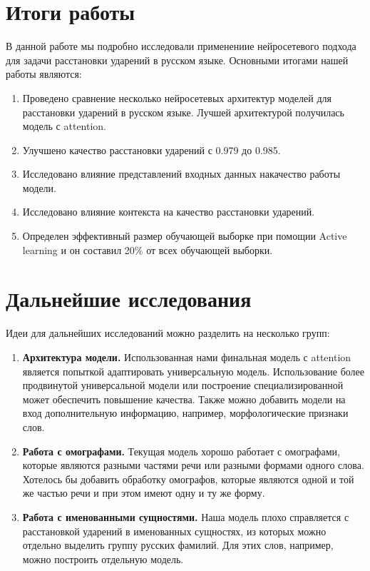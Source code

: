 \documentclass[14pt, a4paper, russian]{extreport}
\begin{document}
\section*{Итоги работы}
В данной работе мы подробно исследовали применениие нейросетевого подхода для задачи расстановки ударений в русском языке.  Основными итогами нашей работы являются:
\begin{enumerate}[  1{)}  ]
	\item Проведено сравнение несколько нейросетевых архитектур моделей для расстановки ударений в русском языке. Лучшей архитектурой получилась модель с attention.
	\item Улучшено качество расстановки ударений с 0.979 до 0.985.
	\item Исследовано влияние представлений входных данных накачество работы модели.
	\item Исследовано влияние контекста на качество расстановки ударений.
	\item Определен эффективный размер обучающей выборке при помощии Active learning и он составил 20\% от всех обучающей выборки. 

\end{enumerate}
\section*{Дальнейшие исследования}
Идеи для дальнейших исследований можно разделить на несколько групп:
\begin{enumerate}[ 1{)} ]
	\item \textbf{Архитектура модели.} Использованная нами финальная модель с attention является попыткой адаптировать универсальную модель. Использование более продвинутой универсальной модели или построение специализированной может обеспечить повышение качества. Также можно добавить модели на вход дополнительную информацию, например, морфологические признаки слов.
	\item \textbf{Работа с омографами.}  Текущая модель хорошо работает с омографами, которые являются разными частями речи или разными формами одного слова. Хотелось бы добавить обработку омографов, которые являются одной и той же частью речи и при этом имеют одну и ту же форму.
	\item \textbf{Работа с именованными сущностями.} Наша  модель плохо справляется с расстановкой ударений в именованных сущностях, из которых можно отдельно выделить группу русских фамилий. Для этих слов, например, можно построить отдельную модель.
	
\end{enumerate}

\newpage
{}

\end{document}
